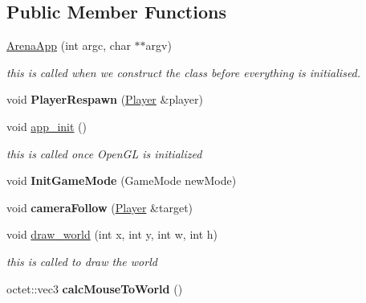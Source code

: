 \subsection*{Public Member Functions}
\begin{DoxyCompactItemize}
\item 
\hypertarget{class_arena_1_1_arena_app_a776812e6a9f3afb3f8772bca67d6d634}{\hyperlink{class_arena_1_1_arena_app_a776812e6a9f3afb3f8772bca67d6d634}{Arena\+App} (int argc, char $\ast$$\ast$argv)}\label{class_arena_1_1_arena_app_a776812e6a9f3afb3f8772bca67d6d634}

\begin{DoxyCompactList}\small\item\em this is called when we construct the class before everything is initialised. \end{DoxyCompactList}\item 
\hypertarget{class_arena_1_1_arena_app_afa8b0fb48148ce8c3c8ef7d5fd2b4929}{void {\bfseries Player\+Respawn} (\hyperlink{class_arena_1_1_player}{Player} \&player)}\label{class_arena_1_1_arena_app_afa8b0fb48148ce8c3c8ef7d5fd2b4929}

\item 
\hypertarget{class_arena_1_1_arena_app_a028f344a4ca7283105dab0578f6c6749}{void \hyperlink{class_arena_1_1_arena_app_a028f344a4ca7283105dab0578f6c6749}{app\+\_\+init} ()}\label{class_arena_1_1_arena_app_a028f344a4ca7283105dab0578f6c6749}

\begin{DoxyCompactList}\small\item\em this is called once Open\+G\+L is initialized \end{DoxyCompactList}\item 
\hypertarget{class_arena_1_1_arena_app_accd060a19632243949d2fed39fc6ec7c}{void {\bfseries Init\+Game\+Mode} (Game\+Mode new\+Mode)}\label{class_arena_1_1_arena_app_accd060a19632243949d2fed39fc6ec7c}

\item 
\hypertarget{class_arena_1_1_arena_app_a685109390442473d4f009625e98c458d}{void {\bfseries camera\+Follow} (\hyperlink{class_arena_1_1_player}{Player} \&target)}\label{class_arena_1_1_arena_app_a685109390442473d4f009625e98c458d}

\item 
\hypertarget{class_arena_1_1_arena_app_ae629e670b9ad33ee08f881cf09a1639d}{void \hyperlink{class_arena_1_1_arena_app_ae629e670b9ad33ee08f881cf09a1639d}{draw\+\_\+world} (int x, int y, int w, int h)}\label{class_arena_1_1_arena_app_ae629e670b9ad33ee08f881cf09a1639d}

\begin{DoxyCompactList}\small\item\em this is called to draw the world \end{DoxyCompactList}\item 
\hypertarget{class_arena_1_1_arena_app_a60d5b448f06cf041c91b7e536eefd52f}{octet\+::vec3 {\bfseries calc\+Mouse\+To\+World} ()}\label{class_arena_1_1_arena_app_a60d5b448f06cf041c91b7e536eefd52f}

\end{DoxyCompactItemize}
